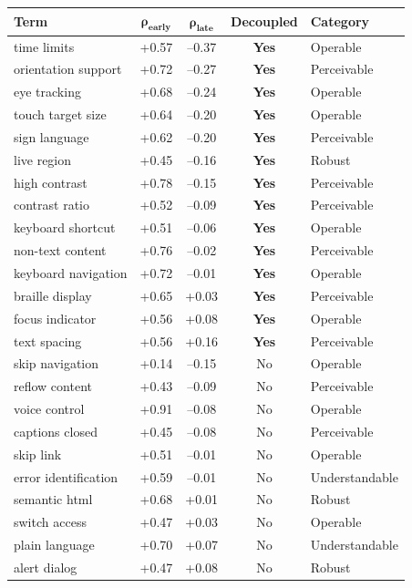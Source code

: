 \documentclass[10pt]{article} %
\begin{document}
\begin{table}[H]
\centering
\scriptsize
\begin{tabular}{|l|c|c|c|l|}
\hline
\textbf{Term} & $\mathbf{\rho_\text{early}}$ & $\mathbf{\rho_\text{late}}$ & \textbf{Decoupled} & \textbf{Category} \\
\hline
time limits & +0.57 & --0.37 & \textbf{Yes} & Operable \\
orientation support & +0.72 & --0.27 & \textbf{Yes} & Perceivable \\
eye tracking & +0.68 & --0.24 & \textbf{Yes} & Operable \\
touch target size & +0.64 & --0.20 & \textbf{Yes} & Operable \\
sign language & +0.62 & --0.20 & \textbf{Yes} & Perceivable \\
live region & +0.45 & --0.16 & \textbf{Yes} & Robust \\
high contrast & +0.78 & --0.15 & \textbf{Yes} & Perceivable \\
contrast ratio & +0.52 & --0.09 & \textbf{Yes} & Perceivable \\
keyboard shortcut & +0.51 & --0.06 & \textbf{Yes} & Operable \\
non-text content & +0.76 & --0.02 & \textbf{Yes} & Perceivable \\
keyboard navigation & +0.72 & --0.01 & \textbf{Yes} & Operable \\
braille display & +0.65 & +0.03 & \textbf{Yes} & Perceivable \\
focus indicator & +0.56 & +0.08 & \textbf{Yes} & Operable \\
text spacing & +0.56 & +0.16 & \textbf{Yes} & Perceivable \\
skip navigation & +0.14 & --0.15 & No & Operable \\
reflow content & +0.43 & --0.09 & No & Perceivable \\
voice control & +0.91 & --0.08 & No & Operable \\
captions closed & +0.45 & --0.08 & No & Perceivable \\
skip link & +0.51 & --0.01 & No & Operable \\
error identification & +0.59 & --0.01 & No & Understandable \\
semantic html & +0.68 & +0.01 & No & Robust \\
switch access & +0.47 & +0.03 & No & Operable \\
plain language & +0.70 & +0.07 & No & Understandable \\
alert dialog & +0.47 & +0.08 & No & Robust \\

\end{tabular}
\end{table}
\end{document}
